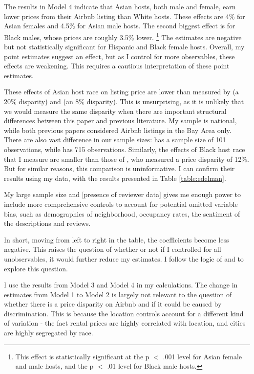 The results in Model 4 indicate that Asian hosts, both male and female, earn lower prices from their Airbnb listing than White hosts. These effects are 4\% for Asian females and 4.5\% for Asian male hosts. The second biggest effect is for Black males, whose prices are roughly 3.5\% lower.%
	\footnote{This effect is statistically significant at the p $<$ .001 level for Asian female and male hosts, and the p $<$ .01 level for Black male hosts.} 
The estimates are negative but not statistically significant for Hispanic and Black female hosts. Overall, my point estimates suggest an effect, but as I control for more observables, these effects are weakening. This requires a cautious interpretation of these point estimates. 

These effects of Asian host race on listing price are lower than measured by \cite{wang} (a 20\% disparity) and \cite{kakar} (an 8\% disparity). This is unsurprising, as it is unlikely that we would measure the same disparity when there are important structural differences between this paper and previous literature. My sample is national, while both previous papers considered Airbnb listings in the Bay Area only. There are also vast difference in our sample sizes: \cite{wang} has a sample size of 101 observations, while \cite{kakar} has 715 observations. Similarly, the effects of Black host race that I measure are smaller than those of \cite{edelman}, who measured a price disparity of 12\%. But for similar reasons, this comparison is uninformative. I can confirm their results using my data, with the results presented in Table \ref{table:edelman}. 

My large sample size and [presence of reviewer data] gives me enough power to include more comprehensive controls to account for potential omitted variable bias, such as demographics of neighborhood, occupancy rates, the sentiment of the descriptions and reviews. 

In short, moving from left to right in the table, the coefficients become less negative. This raises the question of whether or not if I controlled for all unobservables, it would further reduce my estimates. I follow the logic of \cite{oster} and \cite{altonji} to explore this question.

I use the results from Model 3 and Model 4 in my calculations. The change in estimates from Model 1 to Model 2 is largely not relevant to the question of whether there is a price disparity on Airbnb and if it could be caused by discrimination. This is because the location controls account for a different kind of variation - the fact rental prices are highly correlated with location, and cities are highly segregated by race. 

